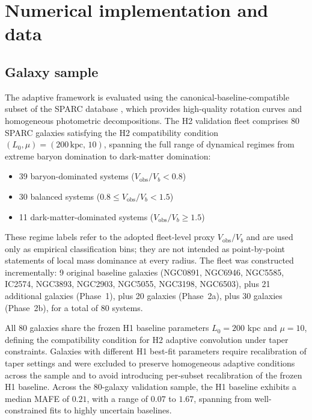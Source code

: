 \documentclass{aa}
\newcommand{\Vobs}{V_{\mathrm{obs}}}
\begin{document}
\section{Numerical implementation and data}

\subsection{Galaxy sample}

The adaptive framework is evaluated using the canonical-baseline-compatible
subset of the SPARC database \citep{lelli2016}, which provides high-quality
rotation curves and homogeneous photometric decompositions. The H2 validation
fleet comprises 80 SPARC galaxies satisfying the H2 compatibility condition
$(L_0, \mu) = (200\,\mathrm{kpc},\,10)$, spanning the full range of dynamical
regimes from extreme baryon domination to dark-matter domination:

\begin{itemize}
	\item 39 baryon-dominated systems ($\Vobs/V_b < 0.8$)
	\item 30 balanced systems ($0.8 \leq \Vobs/V_b < 1.5$)
	\item 11 dark-matter-dominated systems ($\Vobs/V_b \geq 1.5$)
\end{itemize}
These regime labels refer to the adopted fleet-level proxy $V_{\mathrm{obs}}/V_b$ and are used only as empirical classification bins; they are not intended as point-by-point statements of local mass dominance at every radius.
The fleet was constructed incrementally: 9 original baseline galaxies
(NGC0891, NGC6946, NGC5585, IC2574, NGC3893, NGC2903, NGC5055, NGC3198,
NGC6503), plus 21 additional galaxies (Phase~1), plus 20 galaxies
(Phase~2a), plus 30 galaxies (Phase~2b), for a total of 80 systems.

All 80 galaxies share the frozen H1 baseline parameters $L_0 = 200$ kpc
and $\mu = 10$, defining the compatibility condition for H2 adaptive
convolution under taper constraints. Galaxies with different H1 best-fit parameters require recalibration of taper settings and were excluded
to preserve homogeneous adaptive conditions across the sample and to avoid introducing per-subset
recalibration of the frozen H1 baseline. Across the 80-galaxy validation sample, the
H1 baseline exhibits a median MAFE of $0.21$, with a range of $0.07$ to
$1.67$, spanning from well-constrained fits to highly uncertain baselines.
\end{document}
